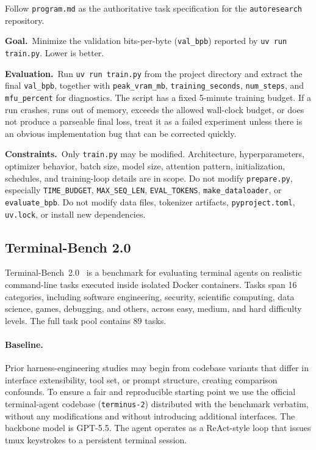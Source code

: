 \begin{promptbox}[title=\textbf{Architecture Design Task Instruction}]
Follow \texttt{program.md} as the authoritative task specification for the
\texttt{autoresearch} repository.

\smallskip
\noindent\textbf{Goal.}~Minimize the validation bits-per-byte
(\texttt{val\_bpb}) reported by \texttt{uv run train.py}.
Lower is better.

\smallskip
\noindent\textbf{Evaluation.}~Run \texttt{uv run train.py} from the project
directory and extract the final \texttt{val\_bpb}, together with
\texttt{peak\_vram\_mb}, \texttt{training\_seconds}, \texttt{num\_steps},
and \texttt{mfu\_percent} for diagnostics.
The script has a fixed 5-minute training budget.
If a run crashes, runs out of memory, exceeds the allowed wall-clock budget, or
does not produce a parseable final loss, treat it as a failed experiment unless
there is an obvious implementation bug that can be corrected quickly.

\smallskip
\noindent\textbf{Constraints.}~Only \texttt{train.py} may be modified.
Architecture, hyperparameters, optimizer behavior, batch size, model size,
attention pattern, initialization, schedules, and training-loop details are in
scope.
Do not modify \texttt{prepare.py}, especially \texttt{TIME\_BUDGET},
\texttt{MAX\_SEQ\_LEN}, \texttt{EVAL\_TOKENS}, \texttt{make\_dataloader}, or
\texttt{evaluate\_bpb}.
Do not modify data files, tokenizer artifacts, \texttt{pyproject.toml},
\texttt{uv.lock}, or install new dependencies.
\end{promptbox}

\subsection{Terminal-Bench 2.0}
\label{app:benchmark-terminal-bench}

Terminal-Bench~2.0~\citep{terminalbench} is a benchmark for evaluating
terminal agents on realistic command-line tasks executed inside isolated
Docker containers.
Tasks span 16 categories, including software engineering, security,
scientific computing, data science, games, debugging, and others, across
easy, medium, and hard difficulty levels.
The full task pool contains 89 tasks.

\paragraph{Baseline.}
Prior harness-engineering studies may begin from codebase variants that
differ in interface extensibility, tool set, or prompt structure, creating
comparison confounds.
To ensure a fair and reproducible starting point we use the official
terminal-agent codebase (\texttt{terminus-2}) distributed with the
benchmark verbatim, without any modifications and without introducing
additional interfaces.
The backbone model is GPT-5.5.
The agent operates as a ReAct-style loop that issues tmux keystrokes to
a persistent terminal session.

